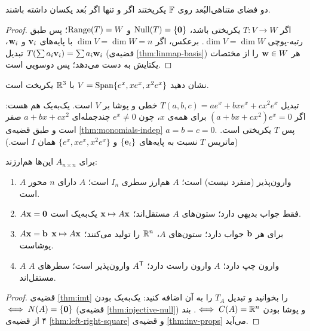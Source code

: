 \begin{theorem}\label{thm:isomorphic-dim}
دو فضای متناهی‌البُعد روی $\mathbb{F}$ یکریختند اگر و تنها اگر بُعد یکسان داشته باشند.
\end{theorem}
\begin{proof}
اگر $T:V\to W$ یکریختی باشد، $\operatorname{Null}(T)=\{\mathbf{0}\}$ و $\operatorname{Range}(T)=W$؛ پس طبق رتبه-پوچی  $\dim V=\dim W$. برعکس، اگر $\dim V=\dim W=n$ با پایه‌های $\mathbf{v}_i$ و $\mathbf{w}_i$، تبدیل $T(\sum a_i\mathbf{v}_i)=\sum a_i\mathbf{w}_i$ (قضیه‌ی \ref{thm:linmap-basis}) هر $\mathbf{w}\in W$ را از مختصات یکتایش به دست می‌دهد؛ پس دوسویی است.
\end{proof}

\begin{example}
نشان دهید $V=\operatorname{Span}\{e^x,xe^x,x^2e^x\}$ با $\mathbb{R}^3$ یکریخت است.
\end{example}
\begin{solution}
تبدیل $T(a,b,c)=ae^x+bxe^x+cx^2e^x$ خطی و پوشا بر $V$ است. یک‌به‌یک هم هست: اگر $(a+bx+cx^2)e^x=0$ برای همه‌ی $x$، چون $e^x\neq0$ چندجمله‌ای $a+bx+cx^2$ صفر است و طبق قضیه‌ی \ref{thm:monomials-indep} $a=b=c=0$. پس $T$ یکریختی است. (ماتریس $T$ نسبت به پایه‌های $\{\mathbf{e}_i\}$ و $\{e^x,xe^x,x^2e^x\}$ همان $I$ است.)
\end{solution}

\begin{theorem}\label{thm:imt-full}
برای $A_{n\times n}$ این‌ها هم‌ارزند:
\begin{enumerate}
  \item $A$ وارون‌پذیر (منفرد نیست) است؛ $A$ هم‌ارز سطری  $I_n$ است؛ $A$ دارای $n$ محور است.
  \item $A\mathbf{x}=\mathbf{0}$ فقط جواب بدیهی دارد؛ ستون‌های $A$ مستقل‌اند؛ $\mathbf{x}\mapsto A\mathbf{x}$ یک‌به‌یک است.
  \item $A\mathbf{x}=\mathbf{b}$ برای هر $\mathbf{b}$ جواب دارد؛ ستون‌های $A$، $\mathbb{R}^n$ را تولید می‌کنند؛ $\mathbf{x}\mapsto A\mathbf{x}$ پوشاست.
  \item $A$ وارون چپ  دارد؛ $A$ وارون راست  دارد؛ $A^{\mathsf{T}}$ وارون‌پذیر است؛ سطرهای $A$ مستقل‌اند.
\end{enumerate}
\end{theorem}
\begin{proof}
قضیه‌ی \ref{thm:imt} را بخوانید و تبدیل $T_A$ را به آن اضافه کنید: یک‌به‌یک بودن $\iff N(A)=\{\mathbf{0}\}$ (قضیه‌ی \ref{thm:injective-null}) و پوشا بودن $\iff C(A)=\mathbb{R}^n$. بند ۴ از قضیه‌ی \ref{thm:left-right-square} و قضیه‌ی \ref{thm:inv-props} می‌آید.
\end{proof}

